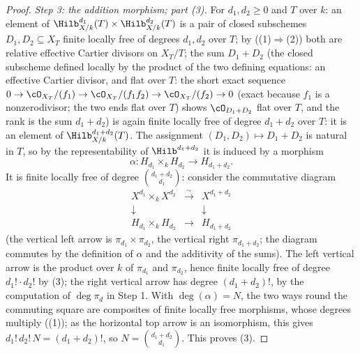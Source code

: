 \begin{proof}
\emph{Step 3: the addition morphism; part (3).}  For $d_1,d_2\ge0$ and
$T$ over $k$: an element of
$\Hilb^{d_1}_{X/k}(T)\times\Hilb^{d_2}_{X/k}(T)$ is a pair of closed
subschemes $D_1,D_2\subseteq X_T$ finite locally free of degrees
$d_1,d_2$ over $T$; by 
((1)$\Rightarrow$(2)) both are relative effective Cartier
divisors on $X_T/T$; the sum $D_1+D_2$ (the closed subscheme defined
locally by the product of the two defining equations: an effective
Cartier divisor, and flat over $T$: the short exact sequence
$0\to\cO_{X_T}/(f_1)\to\cO_{X_T}/(f_1f_2)\to\cO_{X_T}/(f_2)\to0$
(exact because $f_1$ is a nonzerodivisor; the two ends flat over $T$)
shows $\cO_{D_1+D_2}$ flat over $T$, and the rank is the sum
$d_1+d_2$) is again finite locally free of degree $d_1+d_2$ over
$T$: it is an element of $\Hilb^{d_1+d_2}_{X/k}(T)$.  The assignment
$(D_1,D_2)\mapsto D_1+D_2$ is natural in $T$, so by the
representability of $\Hilb^{d_1+d_2}$ it is induced by a morphism
\[
\alpha:H_{d_1}\times_kH_{d_2}\longrightarrow H_{d_1+d_2} .
\]
It is finite locally free of degree $\binom{d_1+d_2}{d_1}$: consider
the commutative diagram
\[
\begin{array}{ccc}
X^{d_1}\times_kX^{d_2}&\stackrel{\sim}{\longrightarrow}&X^{d_1+d_2}\\
\downarrow&&\downarrow\\
H_{d_1}\times_kH_{d_2}&\longrightarrow&H_{d_1+d_2}
\end{array}
\]
(the vertical left arrow is $\pi_{d_1}\times\pi_{d_2}$, the vertical
right $\pi_{d_1+d_2}$; the diagram commutes by the definition of $\alpha$
and the additivity of the sums).  The left vertical arrow is the product
over $k$ of $\pi_{d_1}$ and $\pi_{d_2}$, hence finite locally free of
degree $d_1!\cdot d_2!$ by
(3); the right vertical arrow has
degree $(d_1+d_2)!$, by the computation of $\deg\pi_d$ in Step 1.  With
$\deg(\alpha)=N$, the two ways round the commuting square are composites
of finite locally free morphisms, whose degrees multiply
((1)); as the horizontal top
arrow is an isomorphism, this gives
$d_1!\,d_2!\,N=(d_1+d_2)!$, so $N=\binom{d_1+d_2}{d_1}$.  This proves
(3).
\end{proof}

